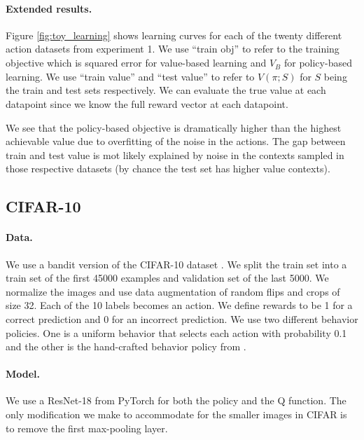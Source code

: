 \begin{subappendices}
\paragraph{Extended results.}
Figure \ref{fig:toy_learning} shows learning curves for each of the twenty different action datasets from experiment 1. We use ``train obj'' to refer to the training objective which is squared error for value-based learning and $ \hat V_B$ for policy-based learning. We use ``train value'' and ``test value'' to refer to  $ V(\pi;S)$ for $ S$ being the train and test sets respectively. We can evaluate the true value at each datapoint since we know the full reward vector at each datapoint.

We see that the policy-based objective is dramatically higher than the highest achievable value due to overfitting of the noise in the actions. The gap between train and test value is mot likely explained by noise in the contexts sampled in those respective datasets (by chance the test set has higher value contexts).



\subsection{CIFAR-10}

\paragraph{Data.} We use a bandit version of the CIFAR-10 dataset \citep{Krizhevsky09learningmultiple}. We split the train set into a train set of the first 45000 examples and validation set of the last 5000. We normalize the images and use data augmentation of random flips and crops of size 32. Each of the 10 labels becomes an action. We define rewards to be 1 for a correct prediction and 0 for an incorrect prediction.
We use two different behavior policies. One is a uniform behavior that selects each action with probability 0.1 and the other is the hand-crafted behavior policy from \cite{joachims2018deep}.

\paragraph{Model.} We use a ResNet-18 \citep{he2016deep} from PyTorch \citep{paszke2019pytorch} for both the policy and the Q function. The only modification we make to accommodate for the smaller images in CIFAR is to remove the first max-pooling layer.


\end{subappendices}
